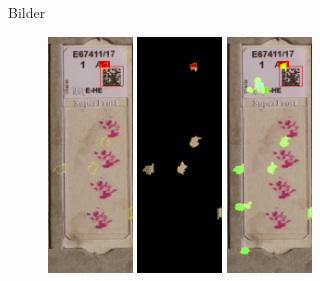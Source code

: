 \documentclass{beamer}
\begin{document}
  \begin{frame}{Bilder}
    \begin{figure}
      \includegraphics[width=0.2\textwidth]{./assets/Cell102723_1_4_top1_positiveonlywithrest.PNG}
      \hfill
      \includegraphics[width=0.2\textwidth]{./assets/Cell102723_1_4_top1_positiveonly.PNG}
      \hfill
      \includegraphics[width=0.2\textwidth]{./assets/Cell102723_1_4_top1_proscons.PNG}
      \hfill

\end{figure}
\end{frame}
\end{document}
